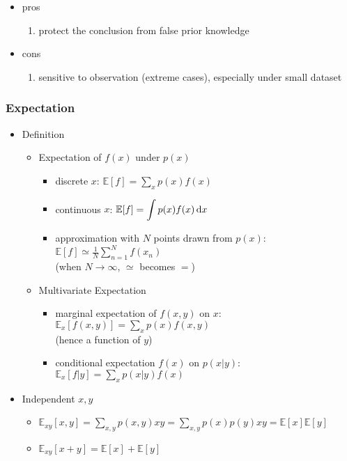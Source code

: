 \begin{itemize}
\begin{itemize}
\begin{itemize}
\begin{enumerate}
 			\end{enumerate}
 		\item pros
 			\begin{enumerate}
 			\item protect the conclusion from false prior knowledge
 			\end{enumerate}
 		\item cons
 			\begin{enumerate}
 			\item sensitive to observation (extreme cases), especially under small dataset
			\end{enumerate}
		\end{itemize}
	\end{itemize}
\end{itemize}

\subsubsection{Expectation}
\begin{itemize}
\item Definition
	\begin{itemize}
	\item Expectation of $f(x)$ under $p(x)$
		\begin{itemize}
		\item discrete $x$: $\displaystyle \mathbb{E}[f] = \sum_xp(x)f(x)$
		\item continuous $x$: $\displaystyle \mathbb{E}[f] = \int p(x)f(x)\mathop{}\!\mathrm{d} x$
		\item approximation with $N$ points drawn from $p(x)$: $\displaystyle \mathbb E[f] \simeq \frac 1N \sum_{n=1}^N f(x_n)$ \\
		(when $N\rightarrow \infty$, $\simeq$ becomes $=$)
		\end{itemize}
	\item Multivariate Expectation
		\begin{itemize}
		\item marginal expectation of $f(x,y)$ on $x$: $\displaystyle \mathbb{E}_x[f(x,y)] = \sum_xp(x)f(x,y)$ \\
		(hence a function of $y$)
		\item conditional expectation $f(x)$ on $p(x|y)$: $\displaystyle \mathbb{E}_x[f|y] = \sum_x p(x|y)f(x)$
		\end{itemize}
	\end{itemize}
	\item Independent $x,y$
		\begin{itemize}
		\item $\displaystyle \mathbb{E}_{xy}[x,y] = \sum_{x,y}p(x,y)xy = \sum_{x,y}p(x)p(y)xy = \mathbb{E}[x]\mathbb{E}[y]$
		\item $\displaystyle \mathbb{E}_{xy}[x+y] = \mathbb{E}[x] + \mathbb{E}[y]$
		\end{itemize}
\end{itemize}


